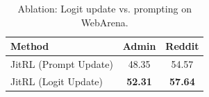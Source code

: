 \begin{table}[t]
  \caption{Ablation: Logit update vs. prompting on WebArena.}
  \label{tab:logit_vs_prompt}
  \begin{center}
    \begin{small}
      \begin{tabular}{lcc}
        \toprule
        \textbf{Method} & \textbf{Admin} & \textbf{Reddit} \\
        \midrule
        JitRL (Prompt Update) & 48.35 & 54.57 \\
        JitRL (Logit Update) & \textbf{52.31} & \textbf{57.64} \\
        \bottomrule
      \end{tabular}
    \end{small}
  \end{center}
\end{table}